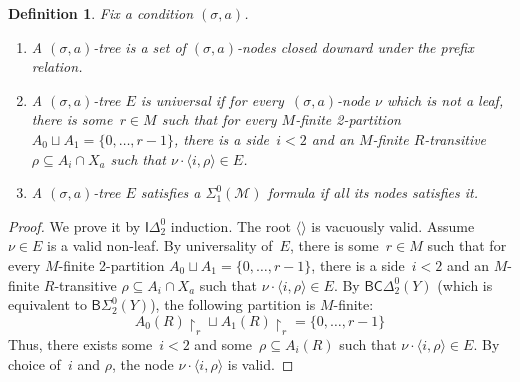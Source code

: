 \documentclass{article}
\numberwithin{theorem}{section}
\newtheorem{lemma}[theorem]{Lemma}
\newtheorem{definition}[theorem]{Definition}
\newcommand{\BSig}{\mathsf{B}\Sigma^0}
\newcommand{\IDel}{\mathsf{I}\Delta^0}
\newcommand{\BCDe}{\mathsf{BC}\Delta^0}
\newcommand{\M}{\mathcal{M}}
\newcommand{\uh}[0]{{\upharpoonright}}
\begin{document}
\begin{definition}
Fix a condition $(\sigma, a)$.
\begin{enumerate}
    \item[(1)] A \emph{$(\sigma, a)$-tree} is a set of $(\sigma, a)$-nodes closed downard under the prefix relation.
    \item[(2)] A $(\sigma, a)$-tree $E$ is \emph{universal} if for every~$(\sigma,a)$-node $\nu$
    which is not a leaf, there is some~$r \in M$ such that for every $M$-finite 2-partition $A_0 \sqcup A_1 = \{0, \dots, r-1\}$, there is a side~$i < 2$ and an $M$-finite $R$-transitive $\rho \subseteq A_i \cap X_a$ such that $\nu \cdot \langle i, \rho \rangle \in E$.
    \item[(3)] A $(\sigma, a)$-tree $E$ satisfies a $\Sigma^0_1(\M)$ formula if all its nodes satisfies it.
\end{enumerate}
\end{definition}


\begin{proof}
We prove it by $\IDel_2$ induction. 
The root $\langle \rangle$ is vacuously valid. Assume  $\nu \in E$ is a valid non-leaf.
By universality of~$E$, there is some~$r \in M$ such that for every $M$-finite 2-partition $A_0 \sqcup A_1 = \{0, \dots, r-1\}$, there is a side~$i < 2$ and an $M$-finite $R$-transitive $\rho \subseteq A_i \cap X_a$ such that $\nu \cdot \langle i, \rho \rangle \in E$. By $\BCDe_2(Y)$ (which is equivalent to $\BSig_2(Y)$), the following partition is $M$-finite:
$$A_0(R) \uh_r \sqcup A_1(R) \uh_r = \{0,\dots, r-1\}$$
Thus, there exists some~$i < 2$ and some~$\rho \subseteq A_i(R)$ such that $\nu \cdot \langle i, \rho \rangle \in E$. By choice of~$i$ and $\rho$, the node $\nu \cdot \langle i, \rho \rangle$ is valid.
\end{proof}
\end{document}
